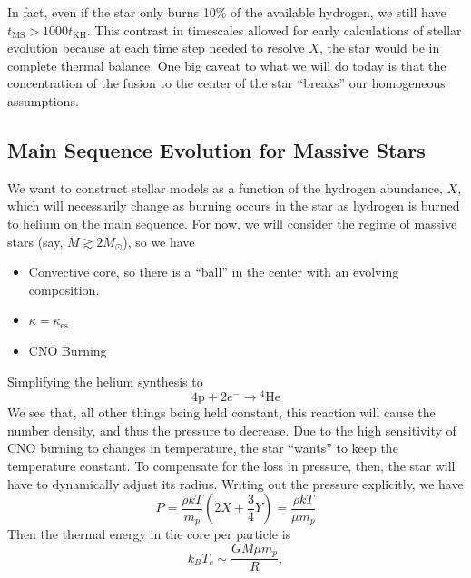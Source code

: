 \documentclass[10pt]{article}
\numberwithin{equation}{section}
\newcommand{\n}{\noindent}
\begin{document}
    \n In fact, even if the star only burns 10\% of the available
    hydrogen, we still have $t_{\mathrm{MS}}>1000
    t_{\mathrm{KH}}$. This contrast in timescales allowed for early
    calculations of stellar evolution because at each time step needed
    to resolve $X$, the star would be in complete thermal balance. One
    big caveat to what we will do today is that the concentration of
    the fusion to the center of the star ``breaks'' our homogeneous
    assumptions.

    \subsection{Main Sequence Evolution for Massive Stars}
    \label{sec:main-sequ-evol}

    We want to construct stellar models as a function of the hydrogen
    abundance, $X$, which will necessarily change as burning occurs in
    the star as hydrogen is burned to helium on the main sequence. For
    now, we will consider the regime of massive stars (say, $M\gtrsim 2M_\odot$),
    so we have
    \begin{itemize}
    \item Convective core, so there is a ``ball'' in the center with
      an evolving composition.
    \item $\kappa=\kappa_{\mathrm{es}}$
    \item CNO Burning
    \end{itemize}
    Simplifying the helium synthesis to
    \begin{equation}
      \label{eq:227}
      4\mathrm{p}+2e^-\to {}^4\mathrm{He}
    \end{equation}
    We see that, all other things being held constant, this reaction
    will cause the number density, and thus the pressure to
    decrease. Due to the high sensitivity of CNO burning to changes in
    temperature, the star ``wants'' to keep the temperature
    constant. To compensate for the loss in pressure, then, the star
    will have to dynamically adjust its radius. Writing out the
    pressure explicitly, we have
    \begin{equation}
      \label{eq:228}
      P=\frac{\rho kT}{m_p}\left(2X+\frac{3}{4}Y\right)=\frac{\rho
        kT}{\mu m_p}
    \end{equation}
    Then the thermal energy in the core per particle is
    \begin{equation}
      \label{eq:229}
      k_B T_c\sim\frac{GM\mu m_p}{R},
    \end{equation}
\end{document}
